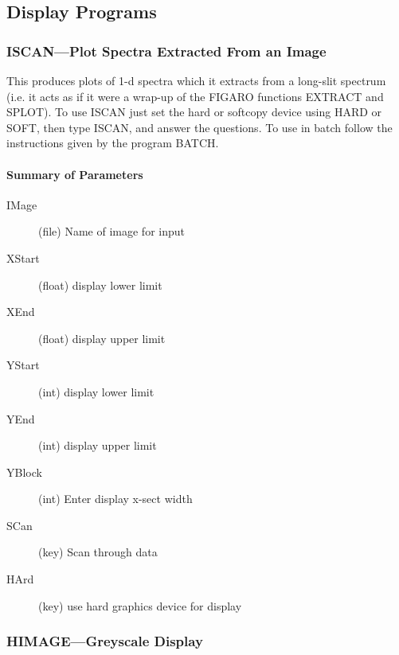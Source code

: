 \documentclass[11pt,twoside]{article}
\newcommand{\xref}[3]{#1}
\newcommand{\xlabel}[1]{}
\begin{document}
\subsection{\xlabel{display_programs}\label{display_programs}Display Programs}

\subsubsection{\xlabel{iscanplot_spectra_extracted_from_an_image}ISCAN---Plot Spectra Extracted From an Image}

This produces plots of 1-d spectra which it extracts from a long-slit
spectrum (i.e. it acts as if it were a wrap-up of the \xref{FIGARO}{sun86}{} functions
EXTRACT and SPLOT).
To use ISCAN just set the hard or softcopy device using HARD or SOFT,
then type ISCAN, and answer the questions. To use in batch follow the
instructions given by the program BATCH.

\paragraph{Summary of Parameters}

\begin{description}
\item[IMage] (file) Name of image for input
\item[XStart] (float) display lower limit
\item[XEnd] (float) display upper limit
\item[YStart] (int) display lower limit
\item[YEnd] (int) display upper limit
\item[YBlock] (int) Enter display x-sect width
\item[SCan] (key) Scan through data
\item[HArd] (key) use hard graphics device for display
\end{description}

\subsubsection{\xlabel{himagegreyscale_display}HIMAGE---Greyscale Display}
\end{document}

